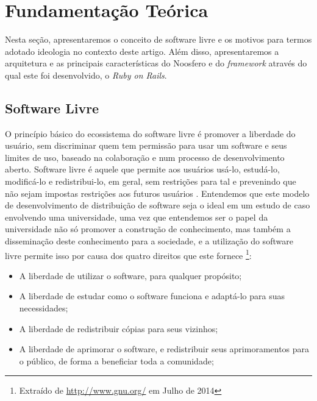 \section{Fundamentação Teórica}
\label{sec:fundamentacao}

Nesta seção, apresentaremos o conceito de software livre e os motivos para
termos adotado ideologia no contexto deste artigo. Além disso, apresentaremos
a arquitetura e as principais características do Noosfero e do
\textit{framework} através do qual este foi desenvolvido, o
\textit{Ruby on Rails}.

\subsection{Software Livre}

O princípio básico do ecossistema do software livre é promover a liberdade
do usuário, sem discriminar quem tem permissão para usar um software e seus
limites de uso, baseado na colaboração e num processo de desenvolvimento
aberto. Software livre é aquele que permite aos usuários usá-lo, estudá-lo,
modificá-lo e redistribui-lo, em geral, sem restrições para tal e prevenindo
que não sejam impostas restrições aos futuros usuários \cite{meirelles2013}.
Entendemos que este modelo de desenvolvimento de distribuição de software
seja o ideal em um estudo de caso envolvendo uma universidade, uma vez que
entendemos ser o papel da universidade não só promover a construção de
conhecimento, mas também a disseminação deste conhecimento para a sociedade,
e a utilização do software livre permite isso por causa dos quatro direitos
que este fornece%
\footnote{Extraído de \url{http://www.gnu.org/} em Julho de 2014}:

\begin{itemize}
  \item A liberdade de utilizar o software, para qualquer propósito;
  \item A liberdade de estudar como o software funciona e adaptá-lo para suas necessidades;
  \item A liberdade de redistribuir cópias para seus vizinhos;
  \item A liberdade de aprimorar o software, e redistribuir seus aprimoramentos para o público,
  de forma a beneficiar toda a comunidade;
\end{itemize}

